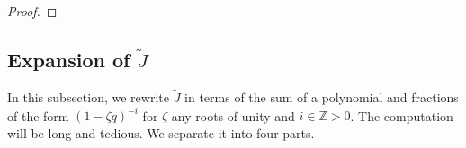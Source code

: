 \documentclass[11pt]{amsart}
\newtheorem*{main theorem*}{Main Theorem}
\theoremstyle{remark}
\numberwithin{equation}{section}
\newcommand{\fake}{{\rm fake}}
\newcommand{\Coeff}{{\rm Coeff}}
\newcommand{\leg}{{\rm leg}}
\newcommand{\arm}{{\rm arm}}
\newcommand{\tail}{{\rm tail}}
\begin{document}
\begin{proof}

\end{proof}


\subsection{Expansion of $\tilde{J}$} \label{s:3.3}
In this subsection, we rewrite $\tilde{J}$ in terms of the sum of a polynomial and fractions of the form $(1-\zeta q)^{-i}$ for $\zeta$ any roots of unity and $i \in \mathbb{Z}>0$. The computation will be long and tedious. We separate it into four parts. 
\end{document}
